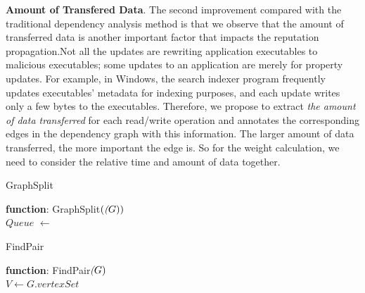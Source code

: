 \textbf{Amount of Transfered Data}.
The second  improvement compared with the traditional dependency analysis method is that we observe that the amount of transferred data is another important factor that impacts the reputation propagation.Not all the updates are rewriting application executables to malicious executables; some updates to an application are merely for property updates.
For example, in Windows, the search indexer program frequently updates executables' metadata for indexing purposes, and each update writes only a few bytes to the executables.
Therefore, we propose to extract \emph{the amount of data transferred} for each read/write operation and annotates the corresponding edges in the dependency graph with this information.
The larger amount of data transferred, the more important the edge is. So for the weight calculation, we need to consider the relative time and amount of data together. 
\begin{algorithm}[tb]
	\caption{GraphSplit}
	\textbf{function}: GraphSplit$(\textit(G))$\\
	$Queue$ $\leftarrow$ \;
	\;	
	\label{alg:split}
\end{algorithm}
\begin{algorithm}[!htbp]
	\caption{FindPair}
	\textbf{function}: FindPair$\textit(G)$\\
	$V \leftarrow G.vertexSet$\;
	\label{alg:find}
\end{algorithm}



